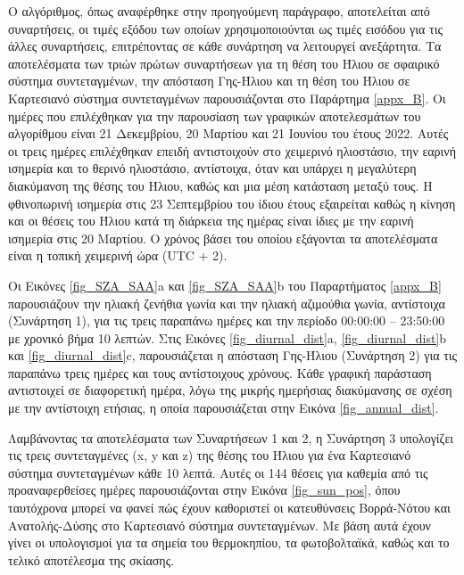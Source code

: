 \documentclass[12pt, a4paper]{report} %
\newcommand{\english}{\foreignlanguage{english}}
\begin{document}
O αλγόριθμος, όπως αναφέρθηκε στην προηγούμενη παράγραφο, αποτελείται από συναρτήσεις, οι τιμές εξόδου των οποίων χρησιμοποιούνται 
ως τιμές εισόδου για τις άλλες συναρτήσεις, επιτρέποντας σε κάθε συνάρτηση να λειτουργεί ανεξάρτητα. Τα αποτελέσματα των τριών 
πρώτων συναρτήσεων για τη θέση του Ήλιου σε σφαιρικό σύστημα συντεταγμένων, την απόσταση Γης-Ήλιου και τη θέση του Ήλιου σε 
Καρτεσιανό σύστημα συντεταγμένων παρουσιάζονται στο Παράρτημα \ref{appx_B}. Οι ημέρες που επιλέχθηκαν για την παρουσίαση των 
γραφικών αποτελεσμάτων του αλγορίθμου είναι 21 Δεκεμβρίου, 20 Μαρτίου και 21 Ιουνίου του έτους 2022. Αυτές οι τρεις ημέρες 
επιλέχθηκαν επειδή αντιστοιχούν στο χειμερινό ηλιοστάσιο, την εαρινή ισημερία και το θερινό ηλιοστάσιο, αντίστοιχα, όταν και 
υπάρχει η μεγαλύτερη διακύμανση της θέσης του Ήλιου, καθώς και μια μέση κατάσταση μεταξύ τους. Η φθινοπωρινή ισημερία στις 23 
Σεπτεμβρίου του ίδιου έτους εξαιρείται καθώς η κίνηση και οι θέσεις του Ήλιου κατά τη διάρκεια της ημέρας είναι ίδιες με την 
εαρινή ισημερία στις 20 Μαρτίου. Ο χρόνος βάσει του οποίου εξάγονται τα αποτελέσματα είναι η τοπική χειμερινή ώρα 
(\english{UTC} + 2).

Οι Εικόνες \ref{fig_SZA_SAA}\english{a} και \ref{fig_SZA_SAA}\english{b} του Παραρτήματος \ref{appx_B} παρουσιάζουν την ηλιακή 
ζενήθια γωνία και την ηλιακή αζιμούθια γωνία, αντίστοιχα (Συνάρτηση 1), για τις τρεις παραπάνω ημέρες και την περίοδο 00:00:00 – 
23:50:00 με χρονικό βήμα 10 λεπτών. Στις Εικόνες \ref{fig_diurnal_dist}\english{a}, \ref{fig_diurnal_dist}\english{b} και 
\ref{fig_diurnal_dist}\english{c}, παρουσιάζεται η απόσταση Γης-Ήλιου (Συνάρτηση 2) για τις παραπάνω τρεις ημέρες και τους 
αντίστοιχους χρόνους. Κάθε γραφική παράσταση αντιστοιχεί σε διαφορετική ημέρα, λόγω της μικρής ημερήσιας διακύμανσης σε σχέση 
με την αντίστοιχη ετήσιας, η οποία παρουσιάζεται στην Εικόνα \ref{fig_annual_dist}.

Λαμβάνοντας τα αποτελέσματα των Συναρτήσεων 1 και 2, η Συνάρτηση 3 υπολογίζει τις τρεις συντεταγμένες (\english{x, y} και 
\english{z}) της θέσης του Ήλιου για ένα Καρτεσιανό σύστημα συντεταγμένων κάθε 10 λεπτά. Αυτές οι 144 θέσεις για καθεμία από 
τις προαναφερθείσες ημέρες παρουσιάζονται στην Εικόνα \ref{fig_sun_pos}, όπου ταυτόχρονα μπορεί να φανεί πώς έχουν καθοριστεί 
οι κατευθύνσεις Βορρά-Νότου και Ανατολής-Δύσης στο Καρτεσιανό σύστημα συντεταγμένων. Με βάση αυτά έχουν γίνει οι υπολογισμοί 
για τα σημεία του θερμοκηπίου, τα φωτοβολταϊκά, καθώς και το τελικό αποτέλεσμα της σκίασης.
\end{document}
